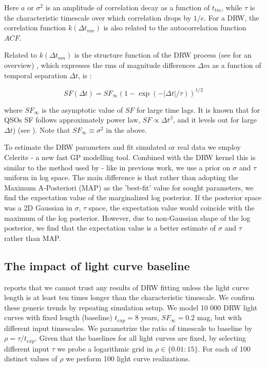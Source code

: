 \documentclass[twocolumn]{aastex62}
\begin{document}
Here $a$ or $\sigma^{2}$ is an amplitude of correlation decay as a function of $t_{tm}$,  while $\tau$ is the characteristic timescale over which correlation drops by $1/e$. For a DRW,  the correlation function $k(\Delta t_{nm})$ is also related to the autocorrelation function $ACF$. 

Related to $k(\Delta t_{nm})$ is the   structure function of the DRW process (see \citet{macleod2012, bauer2009, graham2015a} for an overview) , which expresses the rms of  magnitude differences $\Delta m$ as a function of temporal separation $\Delta t$, is : 

\begin{equation}
SF(\Delta t) = SF_{\infty} (1-\exp{(-|\Delta t|/\tau)})^{1/2}
\end{equation}

where $SF_{\infty}$ is the asymptotic value of $SF$ for large time lags. It is known that for QSOs SF follows approximately power law, $SF \propto \Delta t^{\beta}$,  and it levels out for large $\Delta t$) (see \citet{macleod2012}).  Note that $SF_\infty \equiv \sigma^{2}$  in the above. 


To estimate the  DRW  parameters and fit simulated or real data we employ Celerite - a new fast GP modelling tool\citep{foreman2017}. Combined with the DRW kernel this is similar to the method used by \citet{rybicki1992, kozlowski2010, macleod2010} - like in previous work, we use a  prior on $\sigma$ and $\tau$ uniform in log space.  The main difference is that rather than adopting the Maximum A-Posteriori (MAP) as the 'best-fit' value for sought parameters,  we find the expectation value of the marginalized log posterior. If the posterior space was a 2D Gaussian in $\sigma$, $\tau$ space, the expectation value would coincide with the maximum of the log posterior. However, due to non-Gaussian shape of the log posterior, we find that the expectation value is a better   estimate of $\sigma$ and $\tau$  rather than MAP. 

\subsection{The impact of light curve baseline}

\cite{kozlowski2017a}  reports that we cannot trust any results of DRW fitting unless the light curve length is at least ten times longer than the characteristic timescale. We confirm these generic trends by repeating \cite{kozlowski2017a} simulation setup. We  model 10 000  DRW light curves with fixed length (baseline) $t_{exp}=8$ years, $SF_{\infty} = 0.2$ mag,  but with different input timescales. We parametrize the ratio of timescale to baseline by $\rho = \tau / t_{exp}$. Given that the baselines for all light curves are fixed,  by selecting different input $\tau$ we probe a logarithmic grid in $\rho \in   \{ 0.01 : 15\}$. For each of  100 distinct values of $\rho$ we perform 100 light curve realizations.  
\end{document}
